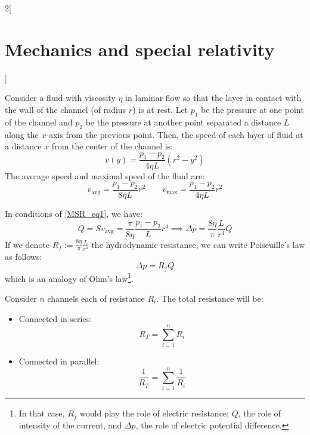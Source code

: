 \documentclass[../../../main_physics.tex]{subfiles}
\begin{document}
\begin{multicols}{2}[\section{Mechanics and special relativity}]
\begin{proposition}[Viscosity]
  \end{proposition}
  \begin{center}
    \begin{minipage}{\linewidth}
      \centering
      
    \end{minipage}
  \end{center}
  \begin{proposition}
    Consider a fluid with viscosity $\eta$ in laminar flow so that the layer in contact with the wall of the channel (of radius $r$) is at rest. Let $p_1$ be the pressure at one point of the channel and $p_2$ be the pressure at another point separated a distance $L$ along the $x$-axis from the previous point. Then, the speed of each layer of fluid at a distance $x$ from the center of the channel is:
    $$v(y)=\frac{p_1-p_2}{4\eta L}(r^2-y^2)$$ The average speed and maximal speed of the fluid are:
    \begin{equation}
      v_\text{avg}=\frac{p_1-p_2}{8\eta L}r^2\qquad v_\text{max}=\frac{p_1-p_2}{4\eta L}r^2
      \label{MSR_eq1}
    \end{equation}
  \end{proposition}
  \begin{proposition}
    In conditions of \cref{MSR_eq1}, we have: $$Q=Sv_\text{avg}=\frac{\pi}{8\eta }\frac{p_1-p_2}{L}r^4\implies\Delta p=\frac{8\eta}{\pi}\frac{L}{r^4}Q$$ If we denote $\displaystyle R_f:=\frac{8\eta}{\pi}\frac{L}{r^4}$ the hydrodynamic resistance, we can write Poiseuille's law as follows: $$\Delta p=R_f Q$$ which is an analogy of Ohm's law\footnote{In that case, $R_f$ would play the role of electric resistance; $Q$, the role of intensity of the current, and $\Delta p$, the role of electric potential difference.}.
  \end{proposition}
  \begin{proposition}
    Consider $n$ channels each of resistance $R_i$. The total resistance will be:
    \begin{itemize}
      \item Connected in series: $$R_T=\sum_{i=1}^nR_i$$
      \item Connected in parallel: $$\frac{1}{R_T}=\sum_{i=1}^n\frac{1}{R_i}$$
    \end{itemize}
  \end{proposition}
  \begin{proposition}

\end{proposition}
\end{multicols}
\end{document}
